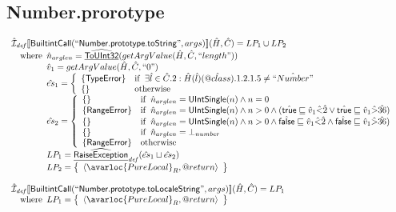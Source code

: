 \subsection{Number.prorotype}
\[
\begin{array}{l}
\aI_{\it def}\lbr \SF{BuiltintCall}(``\SF{Number.prototype.toString}",args)\rbr(\hat{H},\hat{C}) = LP_1 \cup LP_2\\
\quad\wherec{
  \hat{n}_{arglen} = \ahf{ToUInt32}(getArgValue(\hat{H}, \hat{C}, ``length"))\\
  \hat{v}_{1} =getArgValue(\hat{H}, \hat{C}, ``0")\\
  \hat{es}_1 = \left\{\begin{array}{ll}
      \{ \SF{TypeError} \}
      & \ifc{\exists\hat{l}\in\hat{C}.2: \hat{H}(\hat{l})(\avarprop{class}).1.2.1.5 \neq \hat{``Number"}}\\
      \set{} & \owc
    \end{array}\right.\\
  \hat{es}_2 = \left\{\begin{array}{ll}
      \{ \} & \ifc{\hat{n}_{arglen} = \SF{UIntSingle}(n) \land n = 0}\\
      \{ \SF{RangeError} \}
      & \ifc{\hat{n}_{arglen} = \SF{UIntSingle}(n) \land n > 0 
        \land (\atrue \sqsubseteq \hat{v}_1 \hat{<} \hat{2} \lor \atrue \sqsubseteq \hat{v}_1 \hat{>} \hat{36} )}\\
      \{ \} & \ifc{\hat{n}_{arglen} = \SF{UIntSingle}(n) \land n > 0 
        \land \afalse \sqsubseteq \hat{v}_1 \hat{<} \hat{2} \land \afalse \sqsubseteq \hat{v}_1 \hat{>} \hat{36} )}\\
      \{ \} & \ifc{\hat{n}_{arglen} = \bot_{number}}\\
      \{ \SF{RangeError} \} & \owc
    \end{array}\right.\\
  LP_1 = \ahf{RaiseException}_{\it def}(\hat{es}_1 \sqcup \hat{es}_2)\\
  LP_2 = \set{\langle\avarloc{PureLocal}_R,\varprop{return}\rangle}\\
  }\\
\\


\aI_{\it def}\lbr \SF{BuiltintCall}(``\SF{Number.prototype.toLocaleString}",args)\rbr(\hat{H},\hat{C}) = LP_1\\
\quad\wherec{
  LP_1 = \set{\langle\avarloc{PureLocal}_R,\varprop{return}\rangle}\\
  }\\
\\



\end{array}\]
